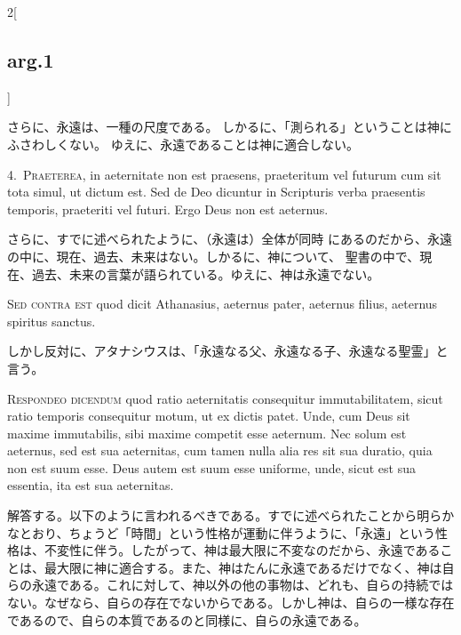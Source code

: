 \documentclass[paper=a4paper,fontsize=10pt,jafontsize=9pt,titlepage]{jlreq}
\begin{document}
\begin{paracol}{2}[\subsection{arg.1}]
\switchcolumn

さらに、永遠は、一種の尺度である。
しかるに、「測られる」ということは神にふさわしくない。
ゆえに、永遠であることは神に適合しない。


4.~{\scshape Praeterea}, in aeternitate non est praesens, praeteritum
vel futurum cum sit tota simul, ut dictum est. Sed de Deo dicuntur in
Scripturis verba praesentis temporis, praeteriti vel futuri. Ergo Deus
non est aeternus.

\switchcolumn

さらに、すでに述べられたように、（永遠は）全体が同時
にあるのだから、永遠の中に、現在、過去、未来はない。しかるに、神について、
聖書の中で、現在、過去、未来の言葉が語られている。ゆえに、神は永遠でない。

\switchcolumn*[\subsection{s.c.}]

{\scshape Sed contra est} quod dicit Athanasius, aeternus pater, aeternus
filius, aeternus spiritus sanctus.

\switchcolumn

しかし反対に、アタナシウスは、「永遠なる父、永遠なる子、永遠なる聖霊」と
言う。


{\scshape Respondeo dicendum} quod ratio aeternitatis consequitur
immutabilitatem, sicut ratio temporis consequitur motum, ut ex dictis
patet. Unde, cum Deus sit maxime immutabilis, sibi maxime competit esse
aeternum. Nec solum est aeternus, sed est sua aeternitas, cum tamen
nulla alia res sit sua duratio, quia non est suum esse. Deus autem est
suum esse uniforme, unde, sicut est sua essentia, ita est sua
aeternitas.

\switchcolumn

解答する。以下のように言われるべきである。すでに述べられたことから明らか
なとおり、ちょうど「時間」という性格が運動に伴うように、「永遠」という性
格は、不変性に伴う。したがって、神は最大限に不変なのだから、永遠であるこ
とは、最大限に神に適合する。また、神はたんに永遠であるだけでなく、神は自
らの永遠である。これに対して、神以外の他の事物は、どれも、自らの持続では
ない。なぜなら、自らの存在でないからである。しかし神は、自らの一様な存在
であるので、自らの本質であるのと同様に、自らの永遠である。


\end{paracol}
\end{document}
